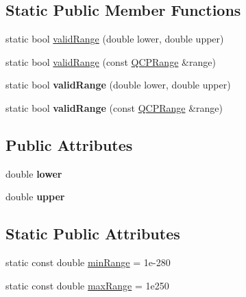 \subsection*{Static Public Member Functions}
\begin{DoxyCompactItemize}
\item 
static bool \hyperlink{class_q_c_p_range_ab38bd4841c77c7bb86c9eea0f142dcc0}{valid\+Range} (double lower, double upper)
\item 
static bool \hyperlink{class_q_c_p_range_a801b964752eaad6219be9d8a651ec2b3}{valid\+Range} (const \hyperlink{class_q_c_p_range}{Q\+C\+P\+Range} \&range)
\item 
static bool {\bfseries valid\+Range} (double lower, double upper)\hypertarget{class_q_c_p_range_a50f6401a622e5bf55a9f5dc11778ec84}{}\label{class_q_c_p_range_a50f6401a622e5bf55a9f5dc11778ec84}

\item 
static bool {\bfseries valid\+Range} (const \hyperlink{class_q_c_p_range}{Q\+C\+P\+Range} \&range)\hypertarget{class_q_c_p_range_a34be594ed3425caf7ad99e957f471186}{}\label{class_q_c_p_range_a34be594ed3425caf7ad99e957f471186}

\end{DoxyCompactItemize}
\subsection*{Public Attributes}
\begin{DoxyCompactItemize}
\item 
double {\bfseries lower}\hypertarget{class_q_c_p_range_aa3aca3edb14f7ca0c85d912647b91745}{}\label{class_q_c_p_range_aa3aca3edb14f7ca0c85d912647b91745}

\item 
double {\bfseries upper}\hypertarget{class_q_c_p_range_ae44eb3aafe1d0e2ed34b499b6d2e074f}{}\label{class_q_c_p_range_ae44eb3aafe1d0e2ed34b499b6d2e074f}

\end{DoxyCompactItemize}
\subsection*{Static Public Attributes}
\begin{DoxyCompactItemize}
\item 
static const double \hyperlink{class_q_c_p_range_a95e4931d712418c3020517cbec669ed1}{min\+Range} = 1e-\/280
\item 
static const double \hyperlink{class_q_c_p_range_a34c2817056d5eb5c32524e34a85b4255}{max\+Range} = 1e250
\end{DoxyCompactItemize}
